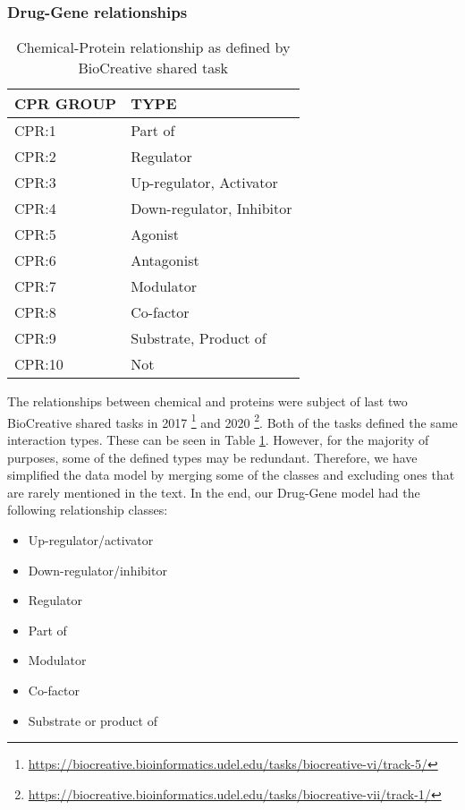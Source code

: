 \documentclass[final,12pt,3p,times,twocolumn,authoryear]{elsarticle}
\begin{document}
\subsubsection{Drug-Gene relationships}
\begin{table}[!htbp]
    \centering
    \begin{tabular}{|l|l|}
    \hline
        CPR GROUP & TYPE \\ \hline
        CPR:1 & Part of \\
        CPR:2 & Regulator\\
        CPR:3 & Up-regulator, Activator\\
        CPR:4 & Down-regulator, Inhibitor\\
        CPR:5 & Agonist\\
        CPR:6 & Antagonist\\
        CPR:7 & Modulator\\
        CPR:8 & Co-factor\\
        CPR:9 & Substrate, Product of\\
        CPR:10 & Not\\
        \hline
    \end{tabular}
    \caption{Chemical-Protein relationship as defined by BioCreative shared task}
    \label{tab:cpr_groups}
\end{table}

The relationships between chemical and proteins were subject of last two BioCreative shared tasks in 2017 \footnote{\url{https://biocreative.bioinformatics.udel.edu/tasks/biocreative-vi/track-5/}} and 2020 \footnote{\url{https://biocreative.bioinformatics.udel.edu/tasks/biocreative-vii/track-1/}}. Both of the tasks defined the same interaction types. These can be seen in Table \ref{tab:cpr_groups}. However, for the majority of purposes, some of the defined types may be redundant. Therefore, we have simplified the data model by merging some of the classes and excluding ones that are rarely mentioned in the text. In the end, our Drug-Gene model had the following relationship classes: 
\begin{itemize}
    \item Up-regulator/activator
    \item Down-regulator/inhibitor
    \item Regulator
    \item Part of
    \item Modulator
    \item Co-factor
    \item Substrate or product of
\end{itemize}
\end{document}
